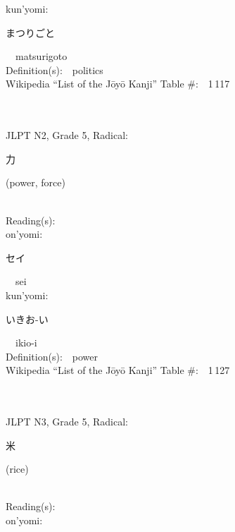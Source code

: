 \begin{multicols}{2}
{\hspace*{1em}}kun'yomi:\ \ \\
{\hspace*{2em}}{\begin{CJK}{UTF8}{min} まつりごと \end{CJK}}\ \ matsurigoto\ \ \\
Definition(s):\ \ politics \\
Wikipedia ``List of the J\=oy\=o Kanji'' Table \#:\ \ 1\,117 \\
\ \ \\
{\fontsize{34pt}{40pt}  }\ \ \\  %
{JLPT N2, Grade 5, Radical:\ \ {\begin{CJK}{UTF8}{min} 力 \end{CJK}} (power, force) } \\
Reading(s):\ \ \\
{\hspace*{1em}}on'yomi:\ \ \\
{\hspace*{2em}}{\begin{CJK}{UTF8}{min} セイ \end{CJK}}\ \ sei\ \ \\
{\hspace*{1em}}kun'yomi:\ \ \\
{\hspace*{2em}}{\begin{CJK}{UTF8}{min} いきお-い \end{CJK}}\ \ ikio-i\ \ \\
Definition(s):\ \ power \\
Wikipedia ``List of the J\=oy\=o Kanji'' Table \#:\ \ 1\,127 \\
\ \ \\
{\fontsize{34pt}{40pt}  }\ \ \\  %
{JLPT N3, Grade 5, Radical:\ \ {\begin{CJK}{UTF8}{min} 米 \end{CJK}} (rice) } \\
Reading(s):\ \ \\
{\hspace*{1em}}on'yomi:\ \ \\

\end{multicols}
